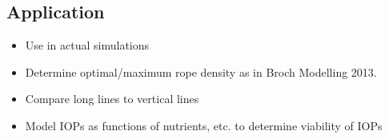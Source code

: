 \subsection{Application}
\begin{itemize}
  \item Use in actual simulations
  \item Determine optimal/maximum rope density as in Broch Modelling 2013.
  \item Compare long lines to vertical lines
  \item Model IOPs as functions of nutrients, etc. to determine viability of IOPs
\end{itemize}



